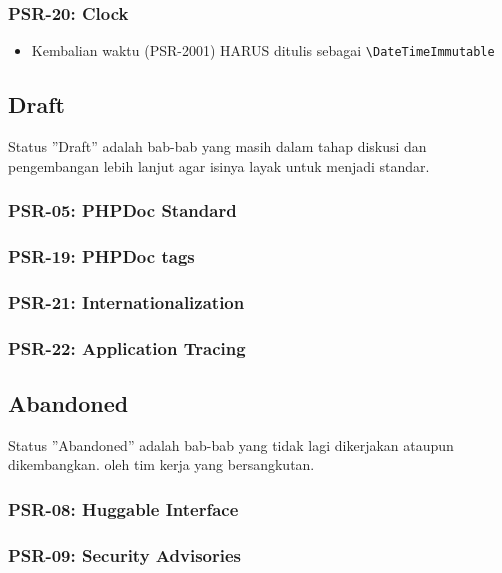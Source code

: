 \subsubsection{PSR-20: Clock}
\label{subsubsec:psr20}
\begin{itemize}
	\item Kembalian waktu (PSR-2001) HARUS ditulis sebagai \verb|\DateTimeImmutable|    
\end{itemize}

\subsection{Draft}
\label{subsec:draft}
Status ''Draft'' adalah bab-bab yang masih dalam tahap diskusi dan pengembangan lebih lanjut agar isinya layak untuk menjadi standar.

\subsubsection{PSR-05: PHPDoc Standard}
\label{subsubsec:psr05}

\subsubsection{PSR-19: PHPDoc tags}
\label{subsubsec:psr19}

\subsubsection{PSR-21: Internationalization}
\label{subsubsec:psr21}

\subsubsection{PSR-22: Application Tracing}
\label{subsubsec:psr22}


\subsection{Abandoned}
\label{subsec:abandoned}
Status ''Abandoned'' adalah bab-bab yang tidak lagi dikerjakan ataupun dikembangkan. oleh tim kerja yang bersangkutan. 

\subsubsection{PSR-08: Huggable Interface}
\label{subsubsec:psr08}

\subsubsection{PSR-09: Security Advisories}
\label{subsubsec:psr09}

